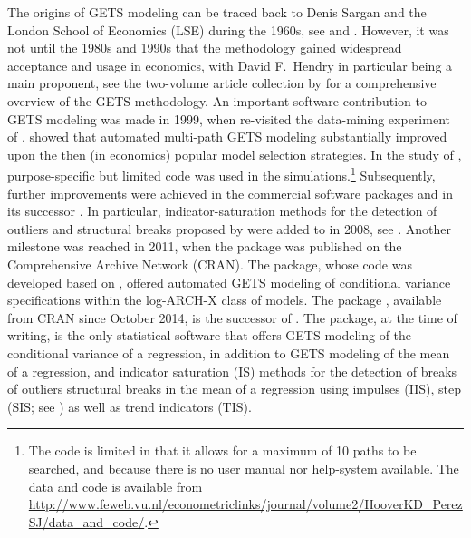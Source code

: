 \documentclass[article,nojss]{jss}
\begin{document}
The origins of GETS modeling can be traced back to Denis Sargan and
the London School of Economics (LSE) during the 1960s, see
\cite{Hendry03} and \cite{Mizon95}. However, it was not until the
1980s and 1990s that the methodology gained widespread acceptance and
usage in economics, with David F.~Hendry in particular being a main
proponent, see the two-volume article collection by
\cite{CamposEricssonHendry2005} for a comprehensive overview of the
GETS methodology. An important software-contribution to GETS modeling
was made in 1999, when \cite{Hooveretal99} re-visited the data-mining
experiment of \cite{Lovell83}. \cite{Hooveretal99} showed that
automated multi-path GETS modeling substantially improved upon the
then (in economics) popular model selection strategies. In the study
of \cite{Hooveretal99}, purpose-specific but limited 
\citep{MATLABR2017b} code was used in the simulations.\footnote{The
  code is limited in that it allows for a maximum of 10 paths to be
  searched, and because there is no user manual nor help-system
  available. The data and  code is available from
  \url{http://www.feweb.vu.nl/econometriclinks/journal/volume2/HooverKD_PerezSJ/data_and_code/}.}
Subsequently, further improvements were achieved in the commercial
software packages  \citep{Hendryetal01} and in its
successor  \citep{DoornikHendry2007}. In particular,
indicator-saturation methods for the detection of outliers and
structural breaks proposed by \cite{HendryJohansenSantos2007} were
added to  in 2008, see \cite{Doornik2009}. Another
milestone was reached in 2011, when the  package
 \citep{AutoSEARCH} was published on the Comprehensive
 Archive Network (CRAN). The package, whose code was
developed based on \cite{SucarratEscribano2012}, offered automated
GETS modeling of conditional variance specifications within the
log-ARCH-X class of models. The  package ,
available from CRAN since October 2014, is the successor of
. The  package, at the time of writing, is
the only statistical software that offers GETS modeling of the
conditional variance of a regression, in addition to GETS modeling of
the mean of a regression, and indicator saturation (IS) methods for
the detection of breaks of outliers structural breaks in the mean of a
regression using impulses (IIS), step (SIS; see
\citealt{castle2015detecting}) as well as trend indicators (TIS).
\end{document}
